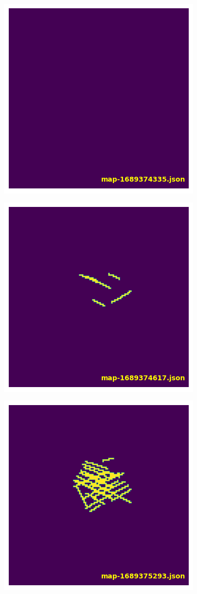 \documentclass[NET,english,beameralt]{tumbeamer}
\begin{document}
\begin{frame}[fragile]
    \begin{figure}
        \includegraphics[width=0.4\columnwidth]{pics/map1.png}
    \end{figure}
\end{frame}

\begin{frame}[fragile]
    \begin{figure}
        \includegraphics[width=0.4\columnwidth]{pics/map2.png}
    \end{figure}
\end{frame}

\begin{frame}[fragile]
    \begin{figure}
        \includegraphics[width=0.4\columnwidth]{pics/map3.png}
    \end{figure}
\end{frame}
\end{document}
